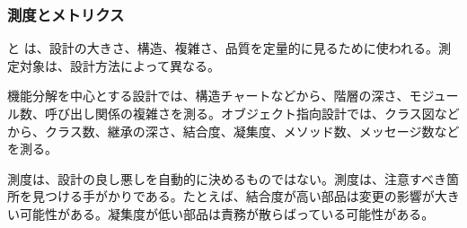 \subsubsection{測度とメトリクス}

 と は、設計の大きさ、構造、複雑さ、品質を定量的に見るために使われる。測定対象は、設計方法によって異なる。

機能分解を中心とする設計では、構造チャートなどから、階層の深さ、モジュール数、呼び出し関係の複雑さを測る。オブジェクト指向設計では、クラス図などから、クラス数、継承の深さ、結合度、凝集度、メソッド数、メッセージ数などを測る。

測度は、設計の良し悪しを自動的に決めるものではない。測度は、注意すべき箇所を見つける手がかりである。たとえば、結合度が高い部品は変更の影響が大きい可能性がある。凝集度が低い部品は責務が散らばっている可能性がある。
